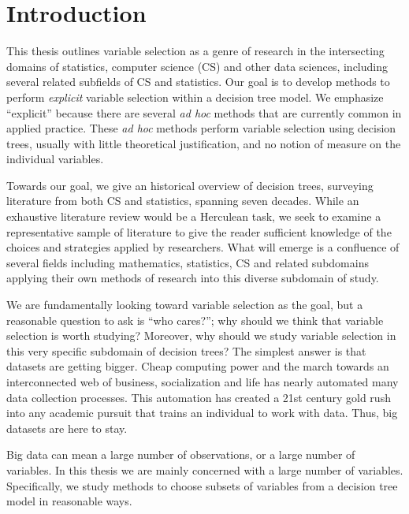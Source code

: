 \section{Introduction}
\label{ch:intro}

This thesis outlines variable selection as a genre of research in the intersecting domains of statistics, computer science (CS) and other data sciences, including several related subfields of CS  and statistics. Our goal is to develop methods to perform \emph{explicit} variable selection within a decision tree model. We emphasize ``explicit'' because there are several \emph{ad hoc} methods that are currently common in applied practice. These \emph{ad hoc} methods perform variable selection using decision trees, usually with little theoretical justification, and no notion of measure on the individual variables. 

Towards our goal, we give an historical overview of decision trees, surveying literature from both CS and statistics, spanning seven decades. While an exhaustive literature review would be a Herculean task, we seek to examine a representative sample of literature to give the reader sufficient knowledge of the choices and strategies applied by researchers. 
What will emerge is a confluence of several fields including mathematics, statistics, CS and related subdomains applying their own methods of research into this diverse subdomain of study.     

We are fundamentally looking toward variable selection as the goal, but a reasonable question to ask is ``who cares?''; why should we think that variable selection is worth studying? Moreover, why should we study variable selection in this very specific subdomain of decision trees? The simplest answer is that datasets are getting bigger. Cheap computing power and the march towards an interconnected web of business, socialization and life has nearly automated many data collection processes. This automation has created a 21st century gold rush into any academic pursuit that trains an individual to work with data. 
Thus, big datasets are here to stay.

 Big data can mean a large number of observations, or a large number of variables. In this thesis we are mainly concerned with a large number of variables. Specifically, we study methods to choose subsets of variables from a decision tree model in reasonable ways. 


